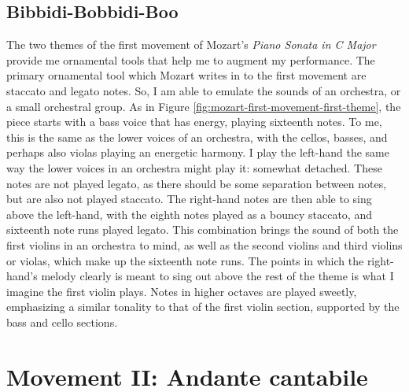 \subsection{Bibbidi-Bobbidi-Boo}

The two themes of the first movement of Mozart's \textit{Piano Sonata in C Major} provide me ornamental tools that help me to augment my performance. The primary ornamental tool which Mozart writes in to the first movement are staccato and legato notes. So, I am able to emulate the sounds of an orchestra, or a small orchestral group. As in Figure \ref{fig:mozart-first-movement-first-theme}\autocite{Henle_1977}, the piece starts with a bass voice that has energy, playing sixteenth notes. To me, this is the same as the lower voices of an orchestra, with the cellos, basses, and perhaps also violas playing an energetic harmony. I play the left-hand the same way the lower voices in an orchestra might play it: somewhat detached. These notes are not played legato, as there should be some separation between notes, but are also not played staccato. The right-hand notes are then able to sing above the left-hand, with the eighth notes played as a bouncy staccato, and sixteenth note runs played legato. This combination brings the sound of both the first violins in an orchestra to mind, as well as the second violins and third violins or violas, which make up the sixteenth note runs. The points in which the right-hand's melody clearly is meant to sing out above the rest of the theme is what I imagine the first violin plays. Notes in higher octaves are played sweetly, emphasizing a similar tonality to that of the first violin section, supported by the bass and cello sections. 

\section{Movement II: Andante cantabile}

